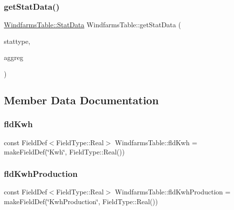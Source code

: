 \mbox{\label{class_windfarms_table_a4e1a8255155a82e2c9e76b3a90431da1}} 
\subsubsection{\texorpdfstring{getStatData()}{getStatData()}\hspace{0.1cm}{\footnotesize\ttfamily [2/2]}}
{\footnotesize\ttfamily \mbox{\hyperlink{struct_windfarms_table_1_1_stat_data}{Windfarms\+Table\+::\+Stat\+Data}} Windfarms\+Table\+::get\+Stat\+Data (\begin{DoxyParamCaption}\item[{\mbox{\hyperlink{class_windfarms_table_a882699395a936d2997b9482c08fe8515}{Windfarms\+Table\+::\+Stat\+Type}}}]{stattype,  }\item[{\mbox{\hyperlink{class_windfarms_table_a59a8562d196d503dd3420e06a4613696}{Windfarms\+Table\+::\+Aggreg}}}]{aggreg }\end{DoxyParamCaption})}



\subsection{Member Data Documentation}
\mbox{\label{class_windfarms_table_abb0742252486f902c65c898415fb6415}} 
\subsubsection{\texorpdfstring{fldKwh}{fldKwh}}
{\footnotesize\ttfamily const Field\+Def$<$Field\+Type\+::\+Real$>$ Windfarms\+Table\+::fld\+Kwh = make\+Field\+Def(\char`\"{}Kwh\char`\"{}, Field\+Type\+::\+Real())}

\mbox{\label{class_windfarms_table_a224d5ca48972136c2b469b86ddd7a4c1}} 
\subsubsection{\texorpdfstring{fldKwhProduction}{fldKwhProduction}}
{\footnotesize\ttfamily const Field\+Def$<$Field\+Type\+::\+Real$>$ Windfarms\+Table\+::fld\+Kwh\+Production = make\+Field\+Def(\char`\"{}Kwh\+Production\char`\"{}, Field\+Type\+::\+Real())}


